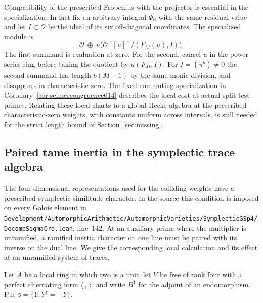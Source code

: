 \documentclass[a4paper,11pt]{article}
\theoremstyle{definition}
\theoremstyle{remark}
\newcommand{\srcloc}[2]{{\small\nolinkurl{#1.lean}}, line~#2}
\numberwithin{equation}{section}
\begin{document}
Compatibility of the prescribed Frobenius with the projector
is essential in the specialization. In fact fix an arbitrary
integral \(\Phi_0\) with the same residual value and let
\(I\subset\mathcal O\) be the ideal of its six off-diagonal
coordinates. The specialized module is
\[
       \mathcal O\ \oplus\
         u\bigl(\mathcal O[[u]]/(F_M(u),I)\bigr).
\]
The first summand is evaluation at zero. For the second, cancel
\(u\) in the power series ring before taking the quotient by
\(u(F_M,I)\). For \(I=(\pi^b)\ne0\) the second summand has
length \(b(M-1)\) by the same monic division, and disappears
in characteristic zero. The fixed commuting specialization in
Corollary~\ref{cor:selmercongruence614} describes the local
cost at actual split test primes. Relating these local charts
to a global Hecke algebra at the prescribed characteristic-zero
weights, with constants uniform across intervals, is still needed
for the strict length bound of Section~\ref{sec:missing}.


\subsection{Paired tame inertia in the symplectic trace algebra}
\label{sec:pairedinertia651}

The four-dimensional representations used for the colliding
weights have a prescribed symplectic similitude character.
In the source this condition is imposed on every Galois
element in
\srcloc{Development/AutomorphicArithmetic/AutomorphicVarieties/SymplecticGSp4/DecompSigmaOrd}{142}.
At an auxiliary prime where the multiplier is unramified, a
ramified inertia character on one line must be paired with
its inverse on the dual line. We give the corresponding local
calculation and its effect at an unramified system of traces.

Let \(A\) be a local ring in which two is a unit, let \(V\)
be free of rank four with a perfect alternating form
\(\langle\, ,\,\rangle\), and write \(B^\dagger\) for the
adjoint of an endomorphism. Put
\(\mathfrak s=\{Y:Y^\dagger=-Y\}\).
\end{document}
